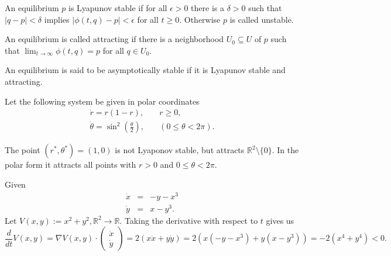 \documentclass{article}
\newcommand*{\R}{\mathbb{R}}
\newcommand*{\half}[1]{\frac{#1}{2}}
\newcommand{\vectwo}[2]{\begin{pmatrix} #1\\#2\end{pmatrix}}
\begin{document}
\begin{defin}
    An equilibrium $p$ is Lyapunov stable if for all $\epsilon > 0$ there is a $\delta > 0$ such that $|q-p| < \delta$ implies $|\phi(t,q)-p| < \epsilon$ for all $t\geq 0$. Otherwise $p$ is called unstable.
\end{defin}

\begin{defin}
    An equilibrium is called attracting if there is a neighborhood $U_0 \subseteq U$ of $p$ such that $\lim_{t\to\infty} \phi(t,q)=p$ for all $q\in U_0$.
\end{defin}

\begin{defin}
    An equilibrium is said to be asymptotically stable if it is Lyapunov stable and attracting.
\end{defin}

\begin{exam}
    Let the following system be given in polar coordinates
    $$\begin{array}{ll}\dot r=r(1-r), &\quad r\geq 0,\\
    \dot \theta=\sin^2\left(\half\theta\right), &\quad (0\leq \theta < 2\pi).\end{array}$$


    The point $(r^*,\theta^*) = (1,0)$ is not Lyaponov stable, but attracts $\R^2\setminus \{0\}$. In the polar form it attracts all points with $r > 0$ and $0\leq \theta < 2\pi$.
\end{exam}

\begin{exam}
    Given
    $$\begin{array}{rcl}\dot x &=& -y-x^3\\
    \dot y &=& x-y^3.\end{array}$$
    Let $V(x,y):= x^2+y^2, \R^2\to\R$. Taking the derivative with respect to $t$ gives us
    $$\frac{d}{dt}V(x,y) = \nabla V(x,y)\cdot\vectwo{\dot x}{\dot y} = 2(x\dot x+y\dot y) =  2(x(-y-x^3)+ y(x-y^3)) = -2(x^4+y^4) < 0.$$
\end{exam}
\end{document}
